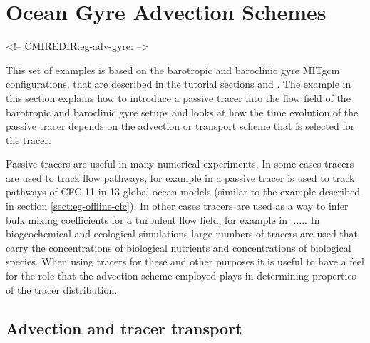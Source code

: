 


\section[Gyre Advection Example]{Ocean Gyre Advection Schemes}
\label{sect:eg-adv-gyre}
\label{www:tutorials}
\begin{rawhtml}
<!-- CMIREDIR:eg-adv-gyre: -->
\end{rawhtml}

This set of examples is based on the barotropic and baroclinic gyre MITgcm configurations,
that are described in the tutorial sections \label{sect:eg-baro} and \label{sect:eg-fourlayer}. 
The example in this section explains how to introduce a passive tracer into the flow 
field of the barotropic and baroclinic gyre setups and looks at how the time evolution
of the passive tracer depends on the advection or transport scheme that is selected 
for the tracer. 

Passive tracers are useful in many numerical experiments. In some cases tracers are
used to track flow pathways, for example in \cite{Dutay02} a passive tracer is used
to track pathways of CFC-11 in 13 global ocean models (similar to the example
described in section \ref{sect:eg-offline-cfc}).
In other cases tracers are used as a way
to infer bulk mixing coefficients for a turbulent flow field, for example in ...... In 
biogeochemical and ecological simulations large numbers of tracers are used that carry the 
concentrations of biological nutrients and concentrations of biological species.
When using tracers for these and other purposes it is useful to have a feel for the role
that the advection scheme employed plays in determining properties of the tracer distribution.

\subsection{Advection and tracer transport}
 






